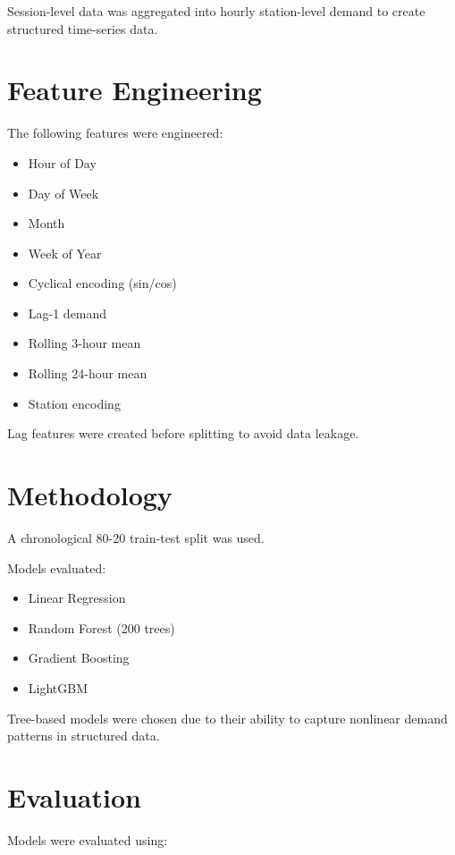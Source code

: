 \documentclass[12pt,a4paper]{article}
\begin{document}
Session-level data was aggregated into hourly station-level demand to create structured time-series data.

\section{Feature Engineering}

The following features were engineered:

\begin{itemize}
    \item Hour of Day
    \item Day of Week
    \item Month
    \item Week of Year
    \item Cyclical encoding (sin/cos)
    \item Lag-1 demand
    \item Rolling 3-hour mean
    \item Rolling 24-hour mean
    \item Station encoding
\end{itemize}

Lag features were created before splitting to avoid data leakage.

\section{Methodology}

A chronological 80-20 train-test split was used.

Models evaluated:

\begin{itemize}
    \item Linear Regression
    \item Random Forest (200 trees)
    \item Gradient Boosting
    \item LightGBM
\end{itemize}

Tree-based models were chosen due to their ability to capture nonlinear demand patterns in structured data.

\section{Evaluation}

Models were evaluated using:
\end{document}
